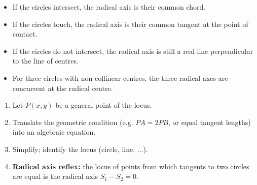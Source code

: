 \documentclass[11pt]{article}
\newcommand{\cle}[1]{{\popxbold\color{popdark}#1}}
\begin{document}
\begin{propriete}
\begin{itemize}
\item If the circles intersect, the radical axis is their common chord.
\item If the circles touch, the radical axis is their common tangent at the point of contact.
\item If the circles do not intersect, the radical axis is still a real line perpendicular to the line of centres.
\item For three circles with non-collinear centres, the three radical axes are concurrent at the \cle{radical centre}.
\end{itemize}
\end{propriete}

\begin{methode}
\begin{enumerate}
\item Let $P(x,y)$ be a general point of the locus.
\item Translate the geometric condition (e.g. $PA=2PB$, or equal tangent lengths) into an algebraic equation.
\item Simplify; identify the locus (circle, line, ...).
\item \textbf{Radical axis reflex:} the locus of points from which tangents to two circles are equal is the radical axis $S_1-S_2=0$.
\end{enumerate}
\end{methode}
\end{document}
